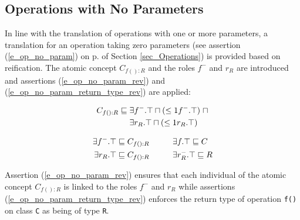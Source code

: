 \subsection{Operations with No Parameters} \label{subsec_Operations with No Parameters}
In line with the translation of operations with one or more parameters, a translation for an operation taking zero parameters 
(see assertion (\ref{e_op_no_param}) on p. \pageref{e_op_no_param} of Section \ref{sec_Operations})
is provided based on reification.
The atomic concept 
$C_{f():R}$ and the roles $f^-$ and $r_R$ are introduced and assertions (\ref{e_op_no_param_rev}) and (\ref{e_op_no_param_return_type_rev}) are applied:

    \begin{equation} \label{e_op_no_param_rev}
      \begin{split}
  	C_{f():R} \sqsubseteq \hspace*{1mm}& \exists f^-.\top \sqcap (\leq 1 f^-.\top) \hspace*{1mm} \sqcap \\
  	\hspace*{1mm}& \exists r_R.\top \sqcap (\leq 1 r_R.\top)\\
    \end{split}
    \end{equation}	
    
    \begin{equation} \label{e_op_no_param_return_type_rev}
      \begin{split}
	\exists f^-.\top &\sqsubseteq C_{f():R}   \hspace*{1cm}  \exists f.\top \sqsubseteq C \\
	\exists r_R.\top &\sqsubseteq C_{f():R}   \hspace*{1cm}  \exists r_R^-.\top \sqsubseteq R\\
      \end{split}
    \end{equation} 

Assertion (\ref{e_op_no_param_rev}) ensures that each individual of the atomic concept $C_{f():R}$ is linked to the roles $f^-$ and $r_R$ while assertions (\ref{e_op_no_param_return_type_rev})
enforces the return type of operation \texttt{f()} on class \texttt{C} as being of type \texttt{R}.
    
    
